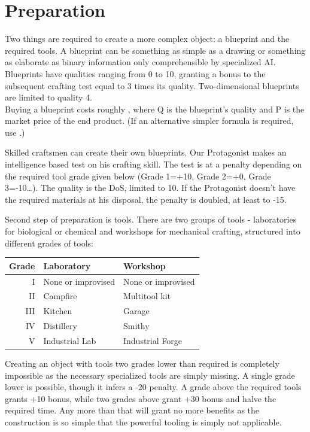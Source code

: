 \documentclass[12pt,a4paper,openany,usenames,dvipsnames]{book}
\begin{document}
	\chapter{Preparation}
	Two things are required to create a more complex object: a blueprint and the required tools.
	A blueprint can be something as simple as a drawing or something as elaborate as binary information only comprehensible by specialized AI. Blueprints have qualities ranging from 0 to 10, granting a bonus to the subsequent crafting test equal to 3 times its quality. Two-dimensional blueprints are limited to quality 4.\\
	Buying a blueprint costs roughly ,
		where Q is the blueprint’s quality and P is the market price of the end product.
	(If an alternative simpler formula is required, use .)\par
	Skilled craftsmen can create their own blueprints.
	Our Protagonist makes an intelligence based test on his crafting skill.
	The test is at a penalty depending on the required tool grade given below (Grade 1=+10, Grade 2=+0, Grade 3=-10…).
	The quality is the DoS, limited to 10.
	If the Protagonist doesn’t have the required materials at his disposal, the penalty is doubled, at least to -15.\par
	Second step of preparation is tools.
	There are two groups of tools
		- laboratories for biological or chemical and workshops for mechanical crafting,
		structured into different grades of tools:
	\par
	\begin{tabularx}{\columnwidth}{r|XX}
		Grade & Laboratory & Workshop \\
		\hline
		I & None or improvised & None or improvised \\
		II & Campfire & Multitool kit \\
		III & Kitchen & Garage \\
		IV & Distillery & Smithy \\
		V & Industrial Lab & Industrial Forge
	\end{tabularx}
	\par
	Creating an object with tools two grades lower than required is completely impossible as the necessary specialized tools are simply missing. A single grade lower is possible, though it infers a -20 penalty. A grade above the required tools grants +10 bonus, while two grades above grant +30 bonus and halve the required time. Any more than that will grant no more benefits as the construction is so simple that the powerful tooling is simply not applicable.\\
\end{document}

